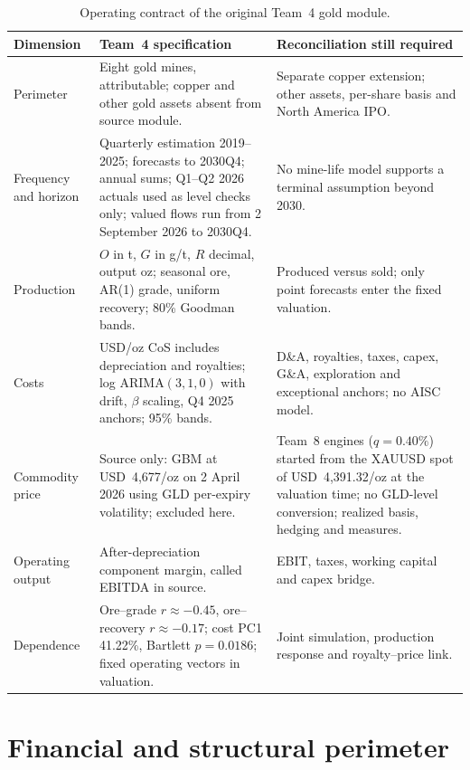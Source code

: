 \begin{table}[H]
\centering
\caption{Operating contract of the original Team~4 gold module.}
\label{tab:company-operating-contract}
\small
\renewcommand{\arraystretch}{1.12}
\begin{tabularx}{\textwidth}{@{}p{2.15cm}X X@{}}
\toprule
\textbf{Dimension} & \textbf{Team~4 specification} &
\textbf{Reconciliation still required} \\
\midrule
Perimeter & Eight gold mines, attributable; copper and other gold assets
absent from source module. & Separate copper extension; other assets,
per-share basis and North America IPO. \\
Frequency and horizon & Quarterly estimation 2019--2025; forecasts to
2030Q4; annual sums; Q1--Q2 2026 actuals used as level checks only; valued
flows run from 2 September 2026 to 2030Q4. & No mine-life model supports a
terminal assumption beyond 2030. \\
Production & $O$ in t, $G$ in g/t, $R$ decimal, output oz; seasonal ore,
AR(1) grade, uniform recovery; 80\% Goodman bands. & Produced versus sold;
only point forecasts enter the fixed valuation. \\
Costs & USD/oz CoS includes depreciation and royalties; log ARIMA$(3,1,0)$
with drift, $\beta$ scaling, Q4 2025 anchors; 95\% bands. & D\&A, royalties,
taxes, capex, G\&A, exploration and exceptional anchors; no AISC model. \\
Commodity price & Source only: GBM at USD~4,677/oz on 2 April 2026 using GLD
per-expiry volatility; excluded here. & Team~8 engines ($q=0.40\%$) started
from the XAUUSD spot of USD~4,391.32/oz at the valuation time; no GLD-level
conversion; realized basis, hedging and measures. \\
Operating output & After-depreciation component margin, called EBITDA in
source. & EBIT, taxes, working capital and capex bridge. \\
Dependence & Ore--grade $r\approx-0.45$, ore--recovery $r\approx-0.17$;
cost PC1 41.22\%, Bartlett $p=0.0186$; fixed operating vectors in valuation.
& Joint simulation, production response and royalty--price link. \\
\bottomrule
\end{tabularx}
\end{table}

\section{Financial and structural perimeter}
\label{sec:company-financial-perimeter}

